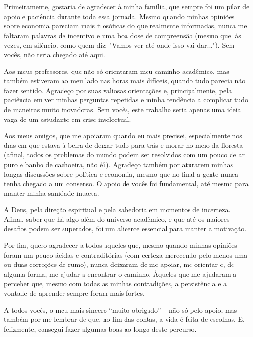 \begin{agradecimentos}
    Primeiramente, gostaria de agradecer à minha família, que sempre foi um pilar de apoio e paciência durante toda essa jornada. Mesmo quando minhas opiniões sobre economia pareciam mais filosóficas do que realmente informadas, nunca me faltaram palavras de incentivo e uma boa dose de compreensão (mesmo que, às vezes, em silêncio, como quem diz: "Vamos ver até onde isso vai dar..."). Sem vocês, não teria chegado até aqui.

    Aos meus professores, que não só orientaram meu caminho acadêmico, mas também estiveram ao meu lado nas horas mais difíceis, quando tudo parecia não fazer sentido. Agradeço por suas valiosas orientações e, principalmente, pela paciência em ver minhas perguntas repetidas e minha tendência a complicar tudo de maneiras muito inovadoras. Sem vocês, este trabalho seria apenas uma ideia vaga de um estudante em crise intelectual.
    
    Aos meus amigos, que me apoiaram quando eu mais precisei, especialmente nos dias em que estava à beira de deixar tudo para trás e morar no meio da floresta (afinal, todos os problemas do mundo podem ser resolvidos com um pouco de ar puro e banho de cachoeira, não é?). Agradeço também por aturarem minhas longas discussões sobre política e economia, mesmo que no final a gente nunca tenha chegado a um consenso. O apoio de vocês foi fundamental, até mesmo para manter minha sanidade intacta.
    
    A Deus, pela direção espiritual e pela sabedoria em momentos de incerteza. Afinal, saber que há algo além do universo acadêmico, e que até os maiores desafios podem ser superados, foi um alicerce essencial para manter a motivação.
    
    Por fim, quero agradecer a todos aqueles que, mesmo quando minhas opiniões foram um pouco ácidas e contraditórias (com certeza merecendo pelo menos uma ou duas correções de rumo), nunca deixaram de me apoiar, me orientar e, de alguma forma, me ajudar a encontrar o caminho. Àqueles que me ajudaram a perceber que, mesmo com todas as minhas contradições, a persistência e a vontade de aprender sempre foram mais fortes.
    
    A todos vocês, o meu mais sincero “muito obrigado” – não só pelo apoio, mas também por me lembrar de que, no fim das contas, a vida é feita de escolhas. E, felizmente, consegui fazer algumas boas ao longo deste percurso.


\end{agradecimentos}
